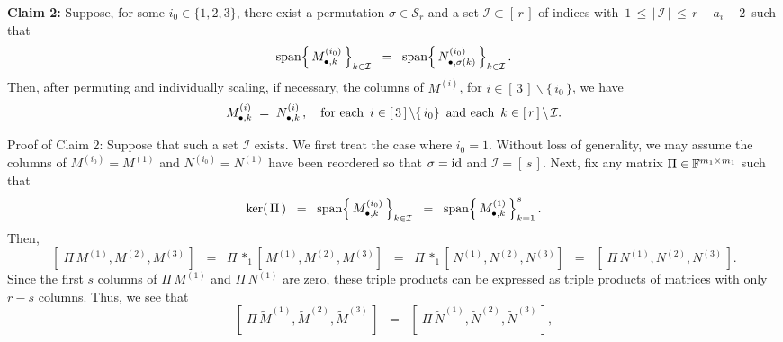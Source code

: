 \vskip 0.5cm
\begin{center}
\begin{minipage}{6.0in}
\textbf{Claim 2:}
\vskip 0.03cm
\noindent
Suppose, for some $i_{0} \in \{1,2,3\}$, there exist a permutation $\sigma \in \mathcal{S}_{r}$
and a set $\mathcal{I} \subset \left[\,r\,\right]$ of indices with
\,$1 \,\leq\, \left\vert\,\mathcal{I}\,\right\vert \,\leq\, r - a_{i} - 2$\, such that
\begin{equation*}
\textnormal{span}\!\left\{\,M^{(i_{0})}_{\bullet,k}\,\right\}_{k\in\mathcal{I}}
\;\; = \;\;
\textnormal{span}\!\left\{\,N^{(i_{0})}_{\bullet,\sigma(k)}\,\right\}_{k\in\mathcal{I}}.
\end{equation*}
Then, after permuting and individually scaling, if necessary, the columns of $M^{(i)}$,
for $i \in \left[\,3\,\right] \backslash \{\,i_{0}\,\}$, we have
\begin{equation*}
M^{(i)}_{\bullet,k} \;=\; N^{(i)}_{\bullet,k}\,,
\quad
\textnormal{for each \,$i \in \left[\,3\,\right]\backslash\{\,i_{0}\}$\, and each \,$k \in \left[\,r\,\right] \backslash\,\mathcal{I}$}.
\end{equation*}
\end{minipage}
\end{center}
Proof of Claim 2:\; Suppose that such a set $\mathcal{I}$ exists.
We first treat the case where $i_{0} = 1$.
Without loss of generality, we may assume the columns of $M^{(i_{0})} = M^{(1)}$ and $N^{(i_{0})} = N^{(1)}$
have been reordered so that $\sigma = \textnormal{id}$ and $\mathcal{I} = \left[\,s\,\right]$.
Next, fix any matrix $\Pi \in \mathbb{F}^{m_{1} \times m_{1}}$ such that
\begin{equation*}
\ker\!\left(\,\Pi\,\right)
\;\; = \;\; \textnormal{span}\!\left\{\,M^{(i_{0})}_{\bullet,k}\,\right\}_{k\in\mathcal{I}}
\;\; = \;\; \textnormal{span}\!\left\{\,M^{(1)}_{\bullet,k}\,\right\}_{k=1}^{s}.
\end{equation*}
Then,
\begin{equation*}
\left[\;\Pi\,M^{(1)},M^{(2)},M^{(3)}\,\right]
\;\; = \;\; \Pi \,*_{1} \left[\,M^{(1)},M^{(2)},M^{(3)}\right]
\;\; = \;\; \Pi \,*_{1} \left[\,N^{(1)},N^{(2)},N^{(3)}\right]
\;\; = \;\; \left[\;\Pi\,N^{(1)},N^{(2)},N^{(3)}\,\right].
\end{equation*}
Since the first $s$ columns of $\Pi\,M^{(1)}$ and $\Pi\,N^{(1)}$ are zero, these triple products
can be expressed as triple products of matrices with only $r - s$ columns.
Thus, we see that
\begin{equation*}
\left[\;\Pi\,\widetilde{M}^{(1)},\widetilde{M}^{(2)},\widetilde{M}^{(3)}\,\right]
\;\; = \;\; \left[\;\Pi\,\widetilde{N}^{(1)},\widetilde{N}^{(2)},\widetilde{N}^{(3)}\,\right],
\end{equation*}
